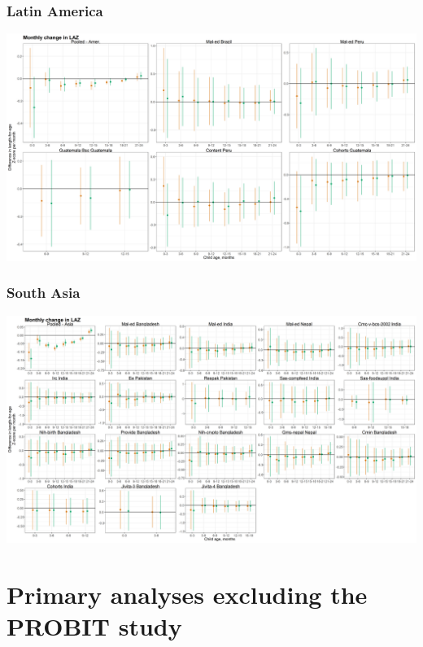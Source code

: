 \documentclass[9pt,]{book}
\begin{document}
\hypertarget{latin-america-4}{%
\subsection{Latin America}\label{latin-america-4}}

\includegraphics[width=75in]{figure-copies/fig-laz-2-laz_vel-cohort-latamer-allage-primary}

\hypertarget{south-asia-4}{%
\subsection{South Asia}\label{south-asia-4}}

\includegraphics[width=75in]{figure-copies/fig-laz-2-laz_vel-cohort-asia-allage-primary}

\hypertarget{exclude-PROBIT}{%
\chapter{Primary analyses excluding the PROBIT study}\label{exclude-PROBIT}}

\raggedright
\end{document}
